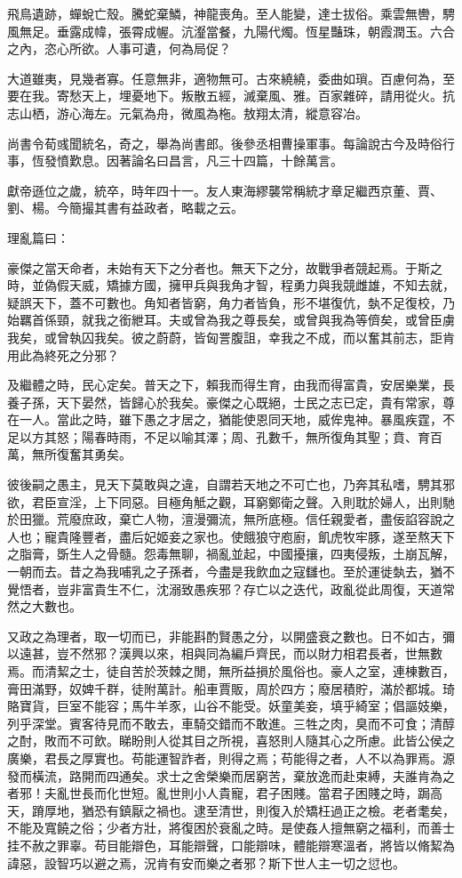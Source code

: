 \begin{pinyinscope}
飛鳥遺跡，蟬蛻亡殼。騰蛇棄鱗，神龍喪角。至人能變，達士拔俗。乘雲無轡，騁風無足。垂露成幃，張霄成幄。沆瀣當餐，九陽代燭。恆星豔珠，朝霞潤玉。六合之內，恣心所欲。人事可遺，何為局促？

大道雖夷，見幾者寡。任意無非，適物無可。古來繞繞，委曲如瑣。百慮何為，至要在我。寄愁天上，埋憂地下。叛散五經，滅棄風、雅。百家雜碎，請用從火。抗志山栖，游心海左。元氣為舟，微風為柂。敖翔太清，縱意容冶。

尚書令荀彧聞統名，奇之，舉為尚書郎。後參丞相曹操軍事。每論說古今及時俗行事，恆發憤歎息。因著論名曰昌言，凡三十四篇，十餘萬言。

獻帝遜位之歲，統卒，時年四十一。友人東海繆襲常稱統才章足繼西京董、賈、劉、楊。今簡撮其書有益政者，略載之云。

理亂篇曰：

豪傑之當天命者，未始有天下之分者也。無天下之分，故戰爭者競起焉。于斯之時，並偽假天威，矯據方國，擁甲兵與我角才智，程勇力與我競雌雄，不知去就，疑誤天下，蓋不可數也。角知者皆窮，角力者皆負，形不堪復伉，埶不足復校，乃始羈首係頸，就我之銜紲耳。夫或曾為我之尊長矣，或曾與我為等儕矣，或曾臣虜我矣，或曾執囚我矣。彼之蔚蔚，皆匈詈腹詛，幸我之不成，而以奮其前志，詎肯用此為終死之分邪？

及繼體之時，民心定矣。普天之下，賴我而得生育，由我而得富貴，安居樂業，長養子孫，天下晏然，皆歸心於我矣。豪傑之心既絕，士民之志已定，貴有常家，尊在一人。當此之時，雖下愚之才居之，猶能使恩同天地，威侔鬼神。暴風疾霆，不足以方其怒；陽春時雨，不足以喻其澤；周、孔數千，無所復角其聖；賁、育百萬，無所復奮其勇矣。

彼後嗣之愚主，見天下莫敢與之違，自謂若天地之不可亡也，乃奔其私嗜，騁其邪欲，君臣宣淫，上下同惡。目極角觝之觀，耳窮鄭衛之聲。入則耽於婦人，出則馳於田獵。荒廢庶政，棄亡人物，澶漫彌流，無所底極。信任親愛者，盡佞諂容說之人也；寵貴隆豐者，盡后妃姬妾之家也。使餓狼守庖廚，飢虎牧牢豚，遂至熬天下之脂膏，斲生人之骨髓。怨毒無聊，禍亂並起，中國擾攘，四夷侵叛，土崩瓦解，一朝而去。昔之為我哺乳之子孫者，今盡是我飲血之寇讎也。至於運徙埶去，猶不覺悟者，豈非富貴生不仁，沈溺致愚疾邪？存亡以之迭代，政亂從此周復，天道常然之大數也。

又政之為理者，取一切而已，非能斟酌賢愚之分，以開盛衰之數也。日不如古，彌以遠甚，豈不然邪？漢興以來，相與同為編戶齊民，而以財力相君長者，世無數焉。而清絜之士，徒自苦於茨棘之閒，無所益損於風俗也。豪人之室，連棟數百，膏田滿野，奴婢千群，徒附萬計。船車賈販，周於四方；廢居積貯，滿於都城。琦賂寶貨，巨室不能容；馬牛羊豕，山谷不能受。妖童美妾，填乎綺室；倡謳妓樂，列乎深堂。賓客待見而不敢去，車騎交錯而不敢進。三牲之肉，臭而不可食；清醇之酎，敗而不可飲。睇盼則人從其目之所視，喜怒則人隨其心之所慮。此皆公侯之廣樂，君長之厚實也。苟能運智詐者，則得之焉；苟能得之者，人不以為罪焉。源發而橫流，路開而四通矣。求士之舍榮樂而居窮苦，棄放逸而赴束縛，夫誰肯為之者邪！夫亂世長而化世短。亂世則小人貴寵，君子困賤。當君子困賤之時，跼高天，蹐厚地，猶恐有鎮厭之禍也。逮至清世，則復入於矯枉過正之檢。老者耄矣，不能及寬饒之俗；少者方壯，將復困於衰亂之時。是使姦人擅無窮之福利，而善士挂不赦之罪辜。苟目能辯色，耳能辯聲，口能辯味，體能辯寒溫者，將皆以脩絜為諱惡，設智巧以避之焉，況肯有安而樂之者邪？斯下世人主一切之愆也。


\end{pinyinscope}

